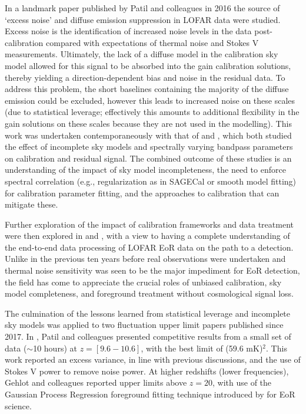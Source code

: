 In a landmark paper published by Patil and colleagues in 2016 \cite{patil16} the source of `excess noise' and diffuse emission suppression in LOFAR data were studied. Excess noise is the identification of increased noise levels in the data post-calibration compared with expectations of thermal noise and Stokes V measurements. Ultimately, the lack of a diffuse model in the calibration sky model allowed for this signal to be absorbed into the gain calibration solutions, thereby yielding a direction-dependent bias and noise in the residual data. To address this problem, the short baselines containing the majority of the diffuse emission could be excluded, however this leads to increased noise on these scales (due to statistical leverage; effectively this amounts to additional flexibility in the gain solutions on these scales because they are not used in the modelling). This work was undertaken contemporaneously with that of \cite{barry16} and \cite{trottwayth2016}, which both studied the effect of incomplete sky models and spectrally varying bandpass parameters on calibration and residual signal. The combined outcome of these studies is an understanding of the impact of sky model incompleteness, the need to enforce spectral correlation (e.g., regularization as in SAGECal or smooth model fitting) for calibration parameter fitting, and the approaches to calibration that can mitigate these. 

Further exploration of the impact of calibration frameworks and data treatment were then explored in \cite{2019MNRAS.483.5480M} and \cite{2019MNRAS.484.2866O}, with a view to having a complete understanding of the end-to-end data processing of LOFAR EoR data on the path to a detection. Unlike in the previous ten years before real observations were undertaken and thermal noise sensitivity was seen to be the major impediment for EoR detection, the field has come to appreciate the crucial roles of unbiased calibration, sky model completeness, and foreground treatment without cosmological signal loss.

The culmination of the lessons learned from statistical leverage and incomplete sky models was applied to two fluctuation upper limit papers published since 2017. In \cite{2017ApJ...838...65P}, Patil and colleagues presented competitive results from a small set of data ($\sim$10 hours) at $z = [9.6 - 10.6]$, with the best limit of (59.6 mK)$^2$. This work reported an excess variance, in line with previous discussions, and the use of Stokes V power to remove noise power. At higher redshifts (lower frequencies), Gehlot and colleagues \cite{2018arXiv180906661G} reported upper limits above $z=20$, with use of the Gaussian Process Regression foreground fitting technique introduced by \cite{2018MNRAS.478.3640M} for EoR science.

